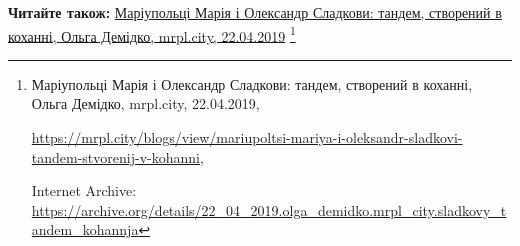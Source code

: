  
 
 
 
 

\def\pubIA{https://archive.org/details/22_04_2019.olga_demidko.mrpl_city.sladkovy_tandem_kohannja}
\def\pubTitle{Маріупольці Марія і Олександр Сладкови: тандем, створений в коханні}
\def\pubDate{22.04.2019}
\def\pubOrigin{https://mrpl.city/blogs/view/mariupoltsi-mariya-i-oleksandr-sladkovi-tandem-stvorenij-v-kohanni}
\textbf{Читайте також:} \href{\pubIA}{%
\pubTitle, Ольга Демідко, mrpl.city, \pubDate}%
\footnote{\pubTitle, Ольга Демідко, mrpl.city, \pubDate, \par\url{\pubOrigin}, \par Internet Archive: \url{\pubIA}}
